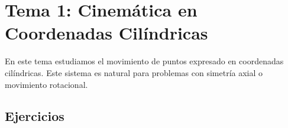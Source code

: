 
\section{Tema 1: Cinemática en Coordenadas Cilíndricas}

En este tema estudiamos el movimiento de puntos expresado en coordenadas cilíndricas.
Este sistema es natural para problemas con simetría axial o movimiento rotacional.

\subsection{Ejercicios}


\clearpage

\clearpage

\clearpage

\clearpage

\clearpage

\clearpage

\clearpage

\clearpage

\clearpage

\clearpage

\clearpage

\clearpage

\clearpage

